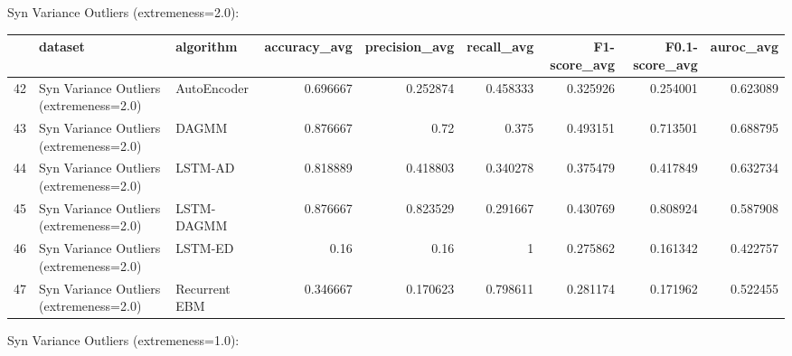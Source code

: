 Syn Variance Outliers (extremeness=2.0):

\begin{tabular}{rllrrrrrr}
\hline
    & dataset                                 & algorithm     &   accuracy\_avg &   precision\_avg &   recall\_avg &   F1-score\_avg &   F0.1-score\_avg &   auroc\_avg \\
\hline
 42 & Syn Variance Outliers (extremeness=2.0) & AutoEncoder   &       0.696667 &        0.252874 &     0.458333 &       0.325926 &         0.254001 &    0.623089 \\
 43 & Syn Variance Outliers (extremeness=2.0) & DAGMM         &       0.876667 &        0.72     &     0.375    &       0.493151 &         0.713501 &    0.688795 \\
 44 & Syn Variance Outliers (extremeness=2.0) & LSTM-AD       &       0.818889 &        0.418803 &     0.340278 &       0.375479 &         0.417849 &    0.632734 \\
 45 & Syn Variance Outliers (extremeness=2.0) & LSTM-DAGMM    &       0.876667 &        0.823529 &     0.291667 &       0.430769 &         0.808924 &    0.587908 \\
 46 & Syn Variance Outliers (extremeness=2.0) & LSTM-ED       &       0.16     &        0.16     &     1        &       0.275862 &         0.161342 &    0.422757 \\
 47 & Syn Variance Outliers (extremeness=2.0) & Recurrent EBM &       0.346667 &        0.170623 &     0.798611 &       0.281174 &         0.171962 &    0.522455 \\
\hline
\end{tabular}

Syn Variance Outliers (extremeness=1.0):

